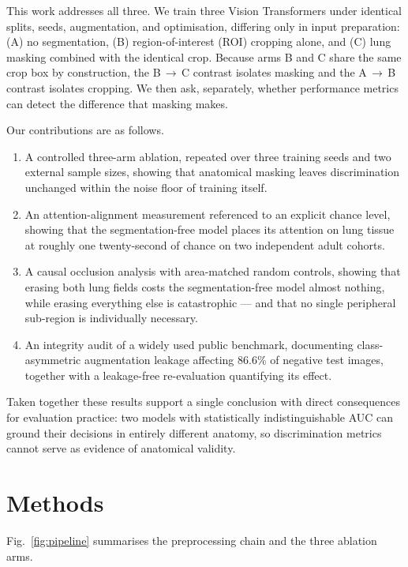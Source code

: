\documentclass[journal,twoside,web]{ieeecolor}
\begin{document}
This work addresses all three. We train three Vision Transformers under identical splits, seeds, augmentation, and optimisation, differing only in input preparation: (A) no segmentation, (B) region-of-interest (ROI) cropping alone, and (C) lung masking combined with the identical crop. Because arms B and C share the same crop box by construction, the B\,$\rightarrow$\,C contrast isolates masking and the A\,$\rightarrow$\,B contrast isolates cropping. We then ask, separately, whether performance metrics can detect the difference that masking makes.

Our contributions are as follows.
\begin{enumerate}
\item A controlled three-arm ablation, repeated over three training seeds and two external sample sizes, showing that anatomical masking leaves discrimination unchanged within the noise floor of training itself.
\item An attention-alignment measurement referenced to an explicit chance level, showing that the segmentation-free model places its attention on lung tissue at roughly one twenty-second of chance on two independent adult cohorts.
\item A causal occlusion analysis with area-matched random controls, showing that erasing both lung fields costs the segmentation-free model almost nothing, while erasing everything else is catastrophic --- and that no single peripheral sub-region is individually necessary.
\item An integrity audit of a widely used public benchmark, documenting class-asymmetric augmentation leakage affecting 86.6\% of negative test images, together with a leakage-free re-evaluation quantifying its effect.
\end{enumerate}

Taken together these results support a single conclusion with direct consequences for evaluation practice: two models with statistically indistinguishable AUC can ground their decisions in entirely different anatomy, so discrimination metrics cannot serve as evidence of anatomical validity.

\section{Methods}
\label{sec:methods}

Fig.~\ref{fig:pipeline} summarises the preprocessing chain and the three ablation arms.
\end{document}
